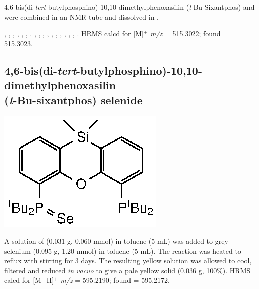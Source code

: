 4,6-bis(di-\emph{tert}-butylphosphino)-10,10-dimethylphenoxasilin (\emph{t}-Bu-Sixantphos) and  were combined in an NMR tube and dissolved in .  

,
,
,
,
,
,
.
,
,
,
,
,
,
,
,
,
,
.
HRMS calcd for  [M]$^+$ \emph{m/z} = 515.3022; found = 515.3023.




\subsection*{4,6-bis(di-\emph{tert}-butylphosphino)-10,10-dimethylphenoxasilin \\(\emph{t}-Bu-sixantphos) selenide}
\begin{structure}[h]
\begin{center}
\includegraphics{../Structures/SitBuSe.eps}
\end{center}
\end{structure}

A solution of \tBuXantphos{} (0.031 g, 0.060 mmol) in toluene (5 mL) was added to grey selenium (0.095 g, 1.20 mmol) in toluene (5 mL).  The reaction was heated to reflux with stirring for 3 days.  The resulting yellow solution was allowed to cool, filtered and reduced \emph{in vacuo} to give a pale yellow solid (0.036 g, 100\%).
HRMS calcd for  [M+H]$^+$ \emph{m/z} = 595.2190; found = 595.2172.

